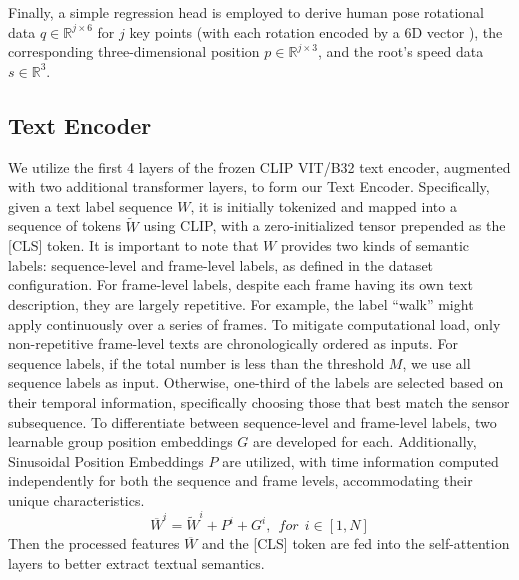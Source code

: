 \documentclass[letterpaper]{article} %
\begin{document}
Finally, a simple regression head is employed to derive human pose rotational data $q \in \mathbb{R}^{j\times6}$ for $j$ key points (with each rotation encoded by a 6D vector \cite{zhou2019continuity}), the corresponding three-dimensional position $p \in \mathbb{R}^{j\times3}$, and the root's speed data $s \in \mathbb{R}^{3}$.

\subsection{Text Encoder} 
We utilize the first 4 layers of the frozen CLIP \cite{radford2021learning} VIT/B32 text encoder, augmented with two additional transformer layers, to form our Text Encoder. Specifically, given a text label sequence $W$, it is initially tokenized and mapped into a sequence of tokens $\widetilde{W}$ using CLIP, with a zero-initialized tensor prepended as the [CLS] token. It is important to note that $W$ provides two kinds of semantic labels: sequence-level and frame-level labels, as defined in the dataset configuration. For frame-level labels, despite each frame having its own text description, they are largely repetitive. For example, the label ``walk'' might apply continuously over a series of frames. To mitigate computational load, only non-repetitive frame-level texts are chronologically ordered as inputs. For sequence labels, if the total number is less than the threshold $M$, we use all sequence labels as input. Otherwise, one-third of the labels are selected based on their temporal information, specifically choosing those that best match the sensor subsequence.
To differentiate between sequence-level and frame-level labels, two learnable group position embeddings \(G\) are developed for each. Additionally, Sinusoidal Position Embeddings \cite{vaswani2017attention} 
\(P\) are utilized, with time information computed independently for both the sequence and frame levels, accommodating their unique characteristics.
\begin{equation}
     \overline{W}^{i} = \widetilde{W}^i+P^i +G^{i}, ~~ for~~ i\in [1,N]
\end{equation}
Then the processed features $\overline{W}$ and the [CLS] token are fed into the self-attention layers to better extract textual semantics.
\end{document}
